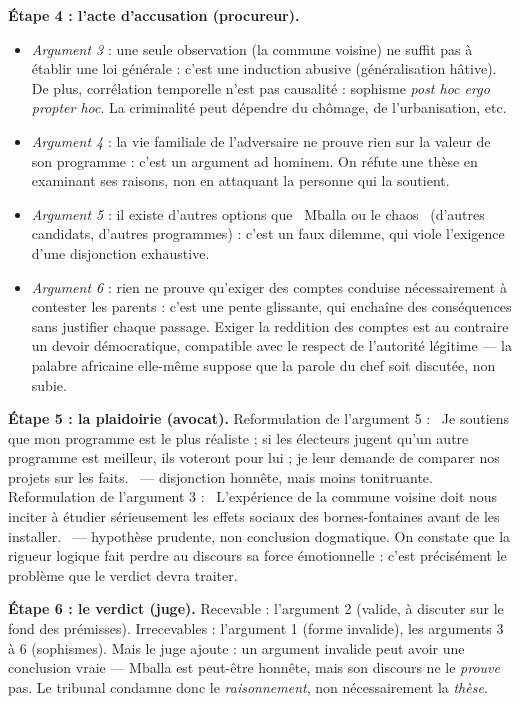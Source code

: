 \documentclass[11pt]{article}
\newcommand{\cle}[1]{{\popxbold\color{popdark}#1}}
\begin{document}
\begin{exoresolu}
\textbf{Étape 4 : l'acte d'accusation (procureur).}
\begin{itemize}
\item \emph{Argument 3} : une seule observation (la commune voisine) ne suffit pas à établir une loi générale : c'est une \cle{induction abusive} (généralisation hâtive). De plus, corrélation temporelle n'est pas causalité : sophisme \emph{post hoc ergo propter hoc}. La criminalité peut dépendre du chômage, de l'urbanisation, etc.
\item \emph{Argument 4} : la vie familiale de l'adversaire ne prouve rien sur la valeur de son programme : c'est un \cle{argument ad hominem}. On réfute une thèse en examinant ses raisons, non en attaquant la personne qui la soutient.
\item \emph{Argument 5} : il existe d'autres options que \guillemotleft\ Mballa ou le chaos \guillemotright\ (d'autres candidats, d'autres programmes) : c'est un \cle{faux dilemme}, qui viole l'exigence d'une disjonction exhaustive.
\item \emph{Argument 6} : rien ne prouve qu'exiger des comptes conduise nécessairement à contester les parents : c'est une \cle{pente glissante}, qui enchaîne des conséquences sans justifier chaque passage. Exiger la reddition des comptes est au contraire un devoir démocratique, compatible avec le respect de l'autorité légitime — la palabre africaine elle-même suppose que la parole du chef soit discutée, non subie.
\end{itemize}

\textbf{Étape 5 : la plaidoirie (avocat).} Reformulation de l'argument 5 : \guillemotleft\ Je soutiens que mon programme est le plus réaliste ; si les électeurs jugent qu'un autre programme est meilleur, ils voteront pour lui ; je leur demande de comparer nos projets sur les faits. \guillemotright\ — disjonction honnête, mais moins tonitruante. Reformulation de l'argument 3 : \guillemotleft\ L'expérience de la commune voisine doit nous inciter à étudier sérieusement les effets sociaux des bornes-fontaines avant de les installer. \guillemotright\ — hypothèse prudente, non conclusion dogmatique. On constate que la rigueur logique fait perdre au discours sa force émotionnelle : c'est précisément le problème que le verdict devra traiter.

\textbf{Étape 6 : le verdict (juge).} Recevable : l'argument 2 (valide, à discuter sur le fond des prémisses). Irrecevables : l'argument 1 (forme invalide), les arguments 3 à 6 (sophismes). Mais le juge ajoute : un argument invalide peut avoir une conclusion vraie — Mballa est peut-être honnête, mais son discours ne le \emph{prouve} pas. Le tribunal condamne donc le \emph{raisonnement}, non nécessairement la \emph{thèse}.


\end{exoresolu}
\end{document}
